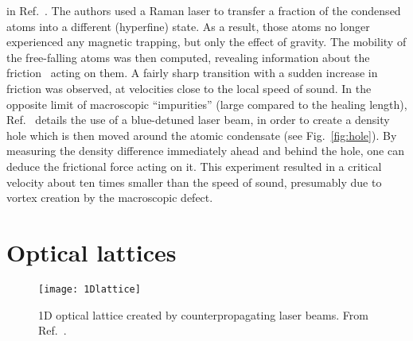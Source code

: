 in Ref.~\cite{Chikkatur_2000}. The authors used a Raman laser to
transfer a fraction of the condensed atoms into a different
(hyperfine) state. As a result, those atoms no longer experienced any
magnetic trapping, but only the effect of gravity. The mobility of the
free-falling atoms was then computed, revealing information about the
friction~\cite{Astrakharchik_2004} acting on them.  A fairly sharp
transition with a sudden increase in friction was observed, at
velocities close to the local speed of sound.
%
In the opposite limit of macroscopic ``impurities'' (large compared to
the healing length), Ref.~\cite{Onofrio_2000} details the use of a
blue-detuned laser beam, in order to create a density hole which is
then moved around the atomic condensate (see Fig.~\ref{fig:hole}).  By
measuring the density difference immediately ahead and behind the
hole, one can deduce the frictional force acting on it. This
experiment resulted in a critical velocity about ten times smaller
than the speed of sound, presumably due to vortex creation by the
macroscopic defect.


\section{Optical lattices}
\label{sec:optical-lattice}
%
\begin{figure}[tb]\centering
  \texttt{[image: 1Dlattice]}
  \caption{
    1D optical lattice created by counterpropagating laser beams. From Ref.~\cite{RevModPhys.78.179}.
  }\label{fig:label}
\end{figure}
% 



